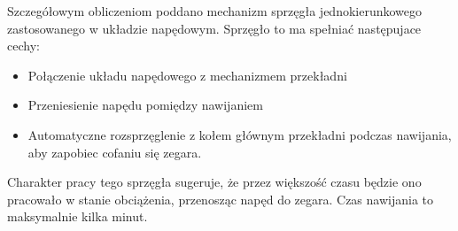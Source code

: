 Szczegółowym obliczeniom poddano mechanizm sprzęgła jednokierunkowego zastosowanego w układzie napędowym. Sprzęgło to ma spełniać następujace cechy:

\begin{itemize}
\item Połączenie układu napędowego z mechanizmem przekładni
\item Przeniesienie napędu pomiędzy nawijaniem
\item Automatyczne rozsprzęglenie z kołem głównym przekładni podczas nawijania, aby zapobiec cofaniu się zegara. 
\end{itemize}

Charakter pracy tego sprzęgła sugeruje, że przez większość czasu będzie ono pracowało w stanie obciążenia, przenosząc napęd do zegara. Czas nawijania to maksymalnie kilka minut.